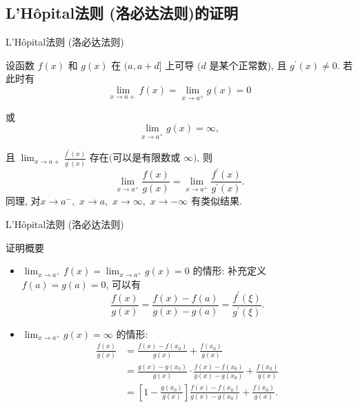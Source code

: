 \documentclass[
10pt,
aspectratio=43,
]{beamer}
\begin{document}
\subsection{{L'Hôpital法则 (洛必达法则)}的证明}
\begin{frame}{L'Hôpital法则 (洛必达法则)}
	\begin{theorem}[L'Hôpital法则]
		设函数 $f(x)$ 和 $g(x)$ 在 $(a, a+d]$ 上可导 $(d$ 是某个正常数), 且 $g^{\prime}(x) \neq 0$. 若此时有
		$$
			\lim _{x \rightarrow a+} f(x)=\lim _{x \rightarrow a^{+}} g(x)=0
		$$

		或
		$$
			\lim _{x \rightarrow a^{+}} g(x)=\infty,
		$$

		且 $\displaystyle\lim _{x \rightarrow a+} \frac{f^{\prime}(x)}{g^{\prime}(x)}$ 存在$($可以是有限数或 $\infty)$, 则
		$$
			\lim _{x \rightarrow a^{+}} \frac{f(x)}{g(x)}=\lim _{x \rightarrow a^{+}} \frac{f^{\prime}(x)}{g^{\prime}(x)} .
		$$
		同理, 对$x\to a^-,\,\,x\to a,\,\,x\to\infty,\,\,x\to -\infty$ 有类似结果.
	\end{theorem}

\end{frame}

\begin{frame}{L'Hôpital法则 (洛必达法则)}
	\begin{exampleblock}{证明概要}
		\begin{itemize}
			\item $\displaystyle\lim _{x \rightarrow a^{+}} f(x)=\lim _{x \rightarrow a^{+}} g(x)=0$ 的情形: 补充定义 $f(a)=g(a)=0$, 可以有
			      $$
				      \frac{f(x)}{g(x)}=\frac{f(x)-f(a)}{g(x)-g(a)}=\frac{f^{\prime}(\xi)}{g^{\prime}(\xi)} .
			      $$
			\item $\displaystyle\lim _{x \rightarrow a^{+}} g(x)=\infty$ 的情形:
			      $$
				      \begin{aligned}
					      \frac{f(x)}{g(x)} & =\frac{f(x)-f\left(x_0\right)}{g(x)}+\frac{f\left(x_0\right)}{g(x)}                                                                   \\
					                        & =\frac{g(x)-g\left(x_0\right)}{g(x)} \cdot \frac{f(x)-f\left(x_0\right)}{g(x)-g\left(x_0\right)}+\frac{f\left(x_0\right)}{g(x)}       \\
					                        & =\left[1-\frac{g\left(x_0\right)}{g(x)}\right] \frac{f(x)-f\left(x_0\right)}{g(x)-g\left(x_0\right)}+\frac{f\left(x_0\right)}{g(x)} .
				      \end{aligned}
			      $$
		\end{itemize}
	\end{exampleblock}
\end{frame}
\end{document}
